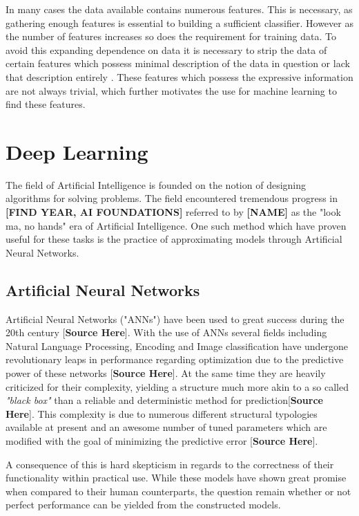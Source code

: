 In many cases the data available contains numerous features. This is necessary, as gathering enough features is essential to building a sufficient classifier. However as the number of features increases so does the requirement for training data. To avoid this expanding dependence on data it is necessary to strip the data of certain features which possess minimal description of the data in question or lack that description entirely \cite{dash1997feature}. These features which possess the expressive information are not always trivial, which further motivates the use for machine learning to find these features.

\section{Deep Learning}

The field of Artificial Intelligence is founded on the notion of designing algorithms for solving problems. The field encountered tremendous progress in \textbf{[FIND YEAR, AI FOUNDATIONS]} referred to by \textbf{[NAME]} as the "look ma, no hands" era of Artificial Intelligence. One such method which have proven useful for these tasks is the practice of approximating models through Artificial Neural Networks.

\subsection{Artificial Neural Networks}
Artificial Neural Networks ("ANNs") have been used to great success during the 20th century [\textbf{Source Here}]. With the use of ANNs
several fields including Natural Language Processing, Encoding and Image classification have undergone revolutionary leaps in performance regarding optimization due to the predictive power of these networks [\textbf{Source Here}]. At the same time they are heavily criticized for their complexity, yielding a structure much more akin to a so called \textit{"black box"} than a reliable and deterministic method for prediction[\textbf{Source Here}]. This complexity is due to numerous different structural typologies available at present and an awesome number of tuned parameters which are modified with the goal of minimizing the predictive error [\textbf{Source Here}].

A consequence of this is hard skepticism in regards to the correctness of their functionality within practical use. While these models have shown great promise when compared to their human counterparts, the question remain whether or not perfect performance can be yielded from the constructed models.\\

